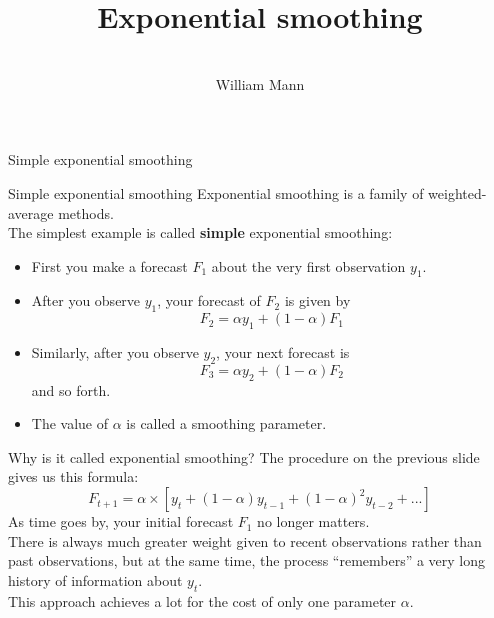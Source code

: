 \documentclass[t,12pt]{beamer}
\begin{document}
\title[Exponential smoothing]{Exponential smoothing}
\author{\vspace{0.35in} \\ {\selectfont William Mann} \vspace{-0.35in}}

\date{}
\maketitle

	\begin{frame}[c]
	\vfill
	\centerline{Simple exponential smoothing}
	\vfill
	\end{frame}

	\begin{frame}[c]{Simple exponential smoothing}
	Exponential smoothing is a family of weighted-average methods.
	\\
	The simplest example is called \textbf{simple} exponential smoothing:
	\begin{itemize}
	\medskip
	\item First you make a forecast $F_1$ about the very first observation $y_1$.
	\smallskip
	\item After you observe $y_1$, your forecast of $F_2$ is given by
	$$
	F_2 = \alpha y_1 + (1-\alpha) F_1
	$$
	\item Similarly, after you observe $y_2$, your next forecast is
	$$
	F_3 = \alpha y_2 + (1-\alpha) F_2
	$$
	and so forth.
	\smallskip
	\item The value of $\alpha$ is called a smoothing parameter.
	\end{itemize}
	\end{frame}

	\begin{frame}[c]{Why is it called exponential smoothing?}
	The procedure on the previous slide gives us this formula:
	$$
	F_{t+1} = \alpha \times \left[ y_t + (1-\alpha)y_{t-1} + (1-\alpha)^2y_{t-2} + ... \right]
	$$
	As time goes by, your initial forecast $F_1$ no longer matters.
	\\ \bigskip
	There is always much greater weight given to recent observations rather than past observations, but at the same time,
	the process ``remembers'' a very long history of information about $y_t$.
	\\ \bigskip
	This approach achieves a lot for the cost of only one parameter $\alpha$.
	\end{frame}
\end{document}
